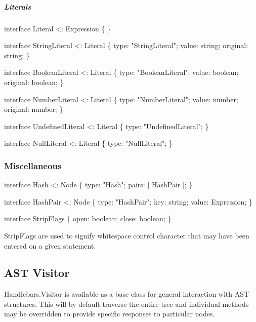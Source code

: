 \subparagraph*{Literals}


\begin{DoxyCode}
\textcolor{keyword}{interface }Literal <: Expression \{ \}

\textcolor{keyword}{interface }StringLiteral <: Literal \{
    type: \textcolor{stringliteral}{"StringLiteral"};
    value: string;
    original: string;
\}

\textcolor{keyword}{interface }BooleanLiteral <: Literal \{
    type: \textcolor{stringliteral}{"BooleanLiteral"};
    value: boolean;
    original: boolean;
\}

\textcolor{keyword}{interface }NumberLiteral <: Literal \{
    type: \textcolor{stringliteral}{"NumberLiteral"};
    value: number;
    original: number;
\}

\textcolor{keyword}{interface }UndefinedLiteral <: Literal \{
    type: \textcolor{stringliteral}{"UndefinedLiteral"};
\}

\textcolor{keyword}{interface }NullLiteral <: Literal \{
    type: \textcolor{stringliteral}{"NullLiteral"};
\}
\end{DoxyCode}


\subsubsection*{Miscellaneous}


\begin{DoxyCode}
\textcolor{keyword}{interface }Hash <: Node \{
    type: \textcolor{stringliteral}{"Hash"};
    pairs: [ HashPair ];
\}

\textcolor{keyword}{interface }HashPair <: Node \{
    type: \textcolor{stringliteral}{"HashPair"};
    key: string;
    value: Expression;
\}

\textcolor{keyword}{interface }StripFlags \{
    open: boolean;
    close: boolean;
\}
\end{DoxyCode}


{\ttfamily Strip\+Flags} are used to signify whitespace control character that may have been entered on a given statement.

\subsection*{A\+S\+T Visitor}

{\ttfamily Handlebars.\+Visitor} is available as a base class for general interaction with A\+S\+T structures. This will by default traverse the entire tree and individual methods may be overridden to provide specific responses to particular nodes.

